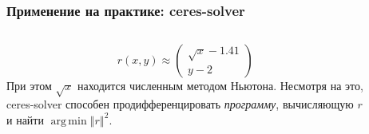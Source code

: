 \documentclass[notheorems,aspectratio=169]{beamer}
\DeclareMathOperator*{\argmin}{arg\,min}
\begin{document}
\begin{frame}
  \frametitle{Применение на практике: ceres-solver}
  \begin{columns}
    \begin{column}{0.4\textwidth}
      \begin{equation*}
        r\left(x, y\right)\approx
        \begin{pmatrix}
          \sqrt{x}-1.41 \\
          y-2
        \end{pmatrix}
      \end{equation*}
      При этом $\sqrt{x}$ находится численным методом Ньютона. Несмотря на это, ceres-solver способен продифференцировать \emph{программу}, вычисляющую $r$ и найти $\argmin\left\Vert r\right\Vert^2$.
    \end{column}

    \begin{column}{0.6\textwidth}
      \begin{figure}
      \end{figure}
    \end{column}
  \end{columns}
\end{frame}
\end{document}
